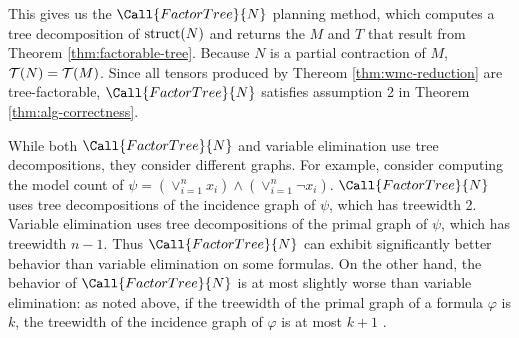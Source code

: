 This gives us the $\Call{FactorTree}{N}$ planning method, which computes a tree decomposition of $\text{struct}(N)$ and returns the $M$ and $T$ that result from Theorem \ref{thm:factorable-tree}. Because $N$ is a partial contraction of $M$, $\mathcal{T}(N) = \mathcal{T}(M)$. Since all tensors produced by Thereom \ref{thm:wmc-reduction} are tree-factorable, $\Call{FactorTree}{N}$ satisfies assumption 2 in Theorem \ref{thm:alg-correctness}. 

While both $\Call{FactorTree}{N}$ and variable elimination \cite{BDP09,KDLD05} use tree decompositions, they consider different graphs. For example, consider computing the model count of $\psi = \left(\lor_{i=1}^n x_i\right) \land \left(\lor_{i=1}^n \neg x_i\right)$. $\Call{FactorTree}{N}$ uses tree decompositions of the incidence graph of $\psi$, which has treewidth 2. Variable elimination uses tree decompositions of the primal graph of $\psi$, which has treewidth $n-1$. Thus $\Call{FactorTree}{N}$ can exhibit significantly better behavior than variable elimination on some formulas. On the other hand, the behavior of $\Call{FactorTree}{N}$ is at most slightly worse than variable elimination: as noted above, if the treewidth of the primal graph of a formula $\varphi$ is $k$, the treewidth of the incidence graph of $\varphi$ is at most $k+1$ \cite{KV00}. %